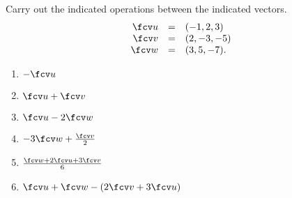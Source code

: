 Carry out the indicated operations between the indicated vectors. 
\[
\begin{array}{rcl}
\fcv u &=& (-1,2,3)\\
\fcv v &=& (2, -3, -5)\\
\fcv w &=& (3,5,-7).\\
\end{array}
\]

\begin{enumerate}
\item $- \fcv u$ 

\item $\fcv u+\fcv v $

\item $\fcv u-2 \fcv w $

\item $-3 \fcv w+\frac{\fcv v}{2} $

\item $\frac{\fcv w+2 \fcv u+3 \fcv v}{6} $

\item $\fcv u+\fcv w-(2\fcv v+3\fcv u) $

\end{enumerate}

